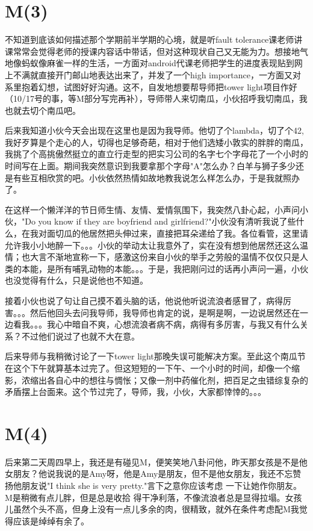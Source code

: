 \documentclass[12pt]{book}
\begin{document}
\section{M(3)}
\label{sec-15-3}
不知道到底该如何描述那个学期前半学期的心境，就是听fault tolerance课老师讲课常常会觉得老师的授课内容话中带话，但对这种现状自己又无能为力。想接地气地像蚂蚁像麻雀一样的生活，一方面对android代课老师把学生的进度表现贴到网上不满就直接开门邮山地表达出来了，并发了一个high importance，一方面又对系里抱着幻想，试图好好沟通。这不，自发地想要帮导师把tower light项目作好（10/17号的事，等M部分写完再补），导师带人来切南瓜，小伙招呼我切南瓜，我也就去切个南瓜吧。

后来我知道小伙今天会出现在这里也是因为我导师。他切了个lambda，切了个42,　我好歹算是个走心的人，切得也足够奇葩，相对于他们选矮小敦实的胖胖的南瓜，我挑了个高挑傲然挺立的直立行走型的把实习公司的名字七个字母花了一个小时的时间写在上面。期间我突然意识到我要拿那个字母"A"怎么办？白羊与狮子多少还是有些互相欣赏的吧。小伙依然热情如故地教我说怎么样怎么办，于是我就照办了。

在这样一个懒洋洋的节日师生情、友情、爱情氛围下，我突然八卦心起，小声问小伙，"Do you know if they are boyfriend and girlfriend?"小伙没有清听我说了些什么，在我对面切瓜的他居然把头伸过来，直接把耳朵递给了我。各位看管，这里请允许我小小地醉一下。。。小伙的举动太让我意外了，实在没有想到他居然还这么温情；也大言不渐地宣称一下，感激这份来自小伙的举手之劳般的温情不仅仅只是人类的本能，是所有哺乳动物的本能。。。于是，我把刚问过的话再小声问一遍，小伙也没觉得有什么，只是说他也不知道。

接着小伙也说了句让自己摸不着头脑的话，他说他听说流浪者感冒了，病得厉害。。。然后他回头去问我导师，我导师也肯定的说，是啊是啊，一边说居然还在一边看我。。。我心中暗自不爽，心想流浪者病不病，病得有多厉害，与我又有什么关系？不过他们说过了也就不大在意。

后来导师与我稍微讨论了一下tower light那晚失误可能解决方案。至此这个南瓜节在这个下午就算基本过完了。但这短短的一下午、一个小时的时间，却像一个缩影，浓缩出各自心中的想往与惆怅；又像一剂中药催化剂，把百足之虫错综复杂的矛盾摆上台面来。这个节过完了，导师，我，小伙，大家都悻悻的。。。

\section{M(4)}
\label{sec-15-4}
后来第二天周四早上，我还是有碰见M，便笑笑地八卦问他，昨天那女孩是不是他女朋友？他说我说的是Amy呀，他是Amy是朋友，但不是他女朋友，我还不忘赞扬他朋友说"I think she is very pretty."言下之意你应该考虑 一下让她作你朋友。M是稍微有点儿胖，但是总是收拾 得干净利落，不像流浪者总是显得拉塌。女孩儿虽然个头不高，但身上没有一点儿多余的肉，很精致，就外在条件考虑配M我觉得应该是绰绰有余了。
\end{document}
